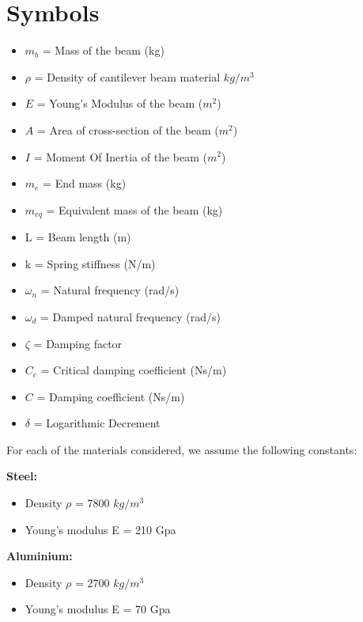 \documentclass{report}
\begin{document}
\pagebreak

\section{Symbols}

\begin{itemize}
    \item $m_b$ = Mass of the beam (kg)
    \item $\rho$ = Density of cantilever beam material $kg/m^3$
    \item $E$ = Young's Modulus of the beam ($m^2$)
    \item $A$ = Area of cross-section of the beam ($m^2$)
    \item $I$ = Moment Of Inertia of the beam ($m^2$)
    \item $m_e$ = End mass (kg)
    \item $m_{eq}$ = Equivalent mass of the beam (kg)
    \item L = Beam length (m)
    \item k = Spring stiffness (N/m)
    \item $\omega_n$ = Natural frequency (rad/s)
    \item $\omega_d$ = Damped natural frequency (rad/s)
    \item $\zeta$ = Damping factor
    \item $C_c$ = Critical damping coefficient (Ns/m)
    \item $C$ = Damping coefficient (Ns/m)
    \item $\delta$ = Logarithmic Decrement 
    
\end{itemize}

For each of the materials considered, we assume the following constants:

{\bfseries Steel:}

\begin{itemize}
    \item Density $\rho$ = 7800 $kg/m^3$
    \item Young's modulus E = 210 Gpa
\end{itemize}

{\bfseries Aluminium:}

\begin{itemize}
    \item Density $\rho$ = 2700 $kg/m^3$
    \item Young's modulus E = 70 Gpa
\end{itemize}
\end{document}
